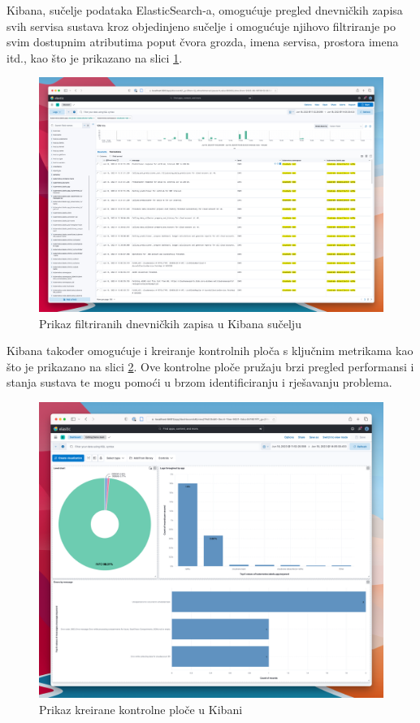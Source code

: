\documentclass[times, utf8, diplomski]{fer}
\begin{document}
Kibana, sučelje podataka ElasticSearch-a, omogućuje pregled dnevničkih zapisa svih servisa sustava kroz objedinjeno sučelje i omogućuje njihovo filtriranje po svim dostupnim atributima poput čvora grozda, imena servisa, prostora imena itd., kao što je prikazano na slici \ref{fig:kibana-filter}.

\begin{figure}[htb]
	\centering
	\includegraphics[width=15cm]{images/kibana-filter.png}
	\caption[Prikaz filtriranih dnevničkih zapisa u Kibana sučelju]{Prikaz filtriranih dnevničkih zapisa  u Kibana sučelju}
	\label{fig:kibana-filter}
\end{figure}

Kibana također omogućuje i kreiranje kontrolnih ploča s ključnim metrikama kao što je prikazano na slici \ref{fig:kibana-dash}. Ove kontrolne ploče pružaju brzi pregled performansi i stanja sustava te mogu pomoći u brzom identificiranju i rješavanju problema.

\begin{figure}[htb]
	\centering
	\includegraphics[width=15cm]{images/kibana-dash.png}
	\caption[Prikaz kreirane kontrolne ploče u Kibani]{Prikaz kreirane kontrolne ploče u Kibani}
	\label{fig:kibana-dash}
\end{figure}
\end{document}
